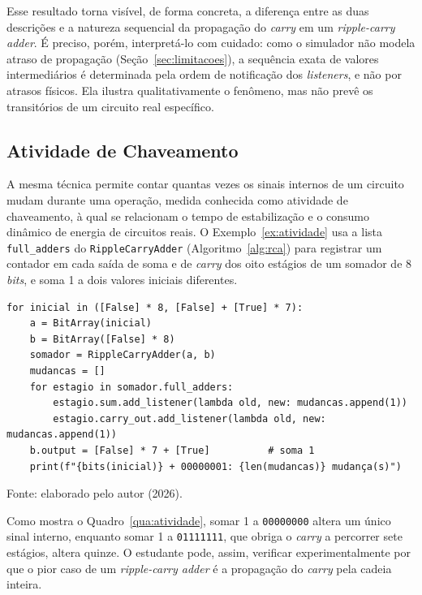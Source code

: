 Esse resultado torna visível, de forma concreta, a diferença entre as duas descrições e a natureza sequencial da propagação do \textit{carry} em um \textit{ripple-carry adder}. É preciso, porém, interpretá-lo com cuidado: como o simulador não modela atraso de propagação (Seção~\ref{sec:limitacoes}), a sequência exata de valores intermediários é determinada pela ordem de notificação dos \textit{listeners}, e não por atrasos físicos. Ela ilustra qualitativamente o fenômeno, mas não prevê os transitórios de um circuito real específico.

\subsection{Atividade de Chaveamento}

A mesma técnica permite contar quantas vezes os sinais internos de um circuito mudam durante uma operação, medida conhecida como atividade de chaveamento, à qual se relacionam o tempo de estabilização e o consumo dinâmico de energia de circuitos reais. O Exemplo~\ref{ex:atividade} usa a lista \texttt{full\_adders} do \texttt{RippleCarryAdder} (Algoritmo~\ref{alg:rca}) para registrar um contador em cada saída de soma e de \textit{carry} dos oito estágios de um somador de 8 \textit{bits}, e soma 1 a dois valores iniciais diferentes.

\begin{exemplo}[H]
\caption{Contagem da atividade de chaveamento de um somador de 8 \textit{bits}.}
\label{ex:atividade}
\begin{verbatim}
for inicial in ([False] * 8, [False] + [True] * 7):
    a = BitArray(inicial)
    b = BitArray([False] * 8)
    somador = RippleCarryAdder(a, b)
    mudancas = []
    for estagio in somador.full_adders:
        estagio.sum.add_listener(lambda old, new: mudancas.append(1))
        estagio.carry_out.add_listener(lambda old, new: mudancas.append(1))
    b.output = [False] * 7 + [True]          # soma 1
    print(f"{bits(inicial)} + 00000001: {len(mudancas)} mudança(s)")
\end{verbatim}
\begin{center}
\footnotesize Fonte: elaborado pelo autor (2026).
\end{center}
\end{exemplo}

Como mostra o Quadro~\ref{qua:atividade}, somar 1 a \texttt{00000000} altera um único sinal interno, enquanto somar 1 a \texttt{01111111}, que obriga o \textit{carry} a percorrer sete estágios, altera quinze. O estudante pode, assim, verificar experimentalmente por que o pior caso de um \textit{ripple-carry adder} é a propagação do \textit{carry} pela cadeia inteira.

